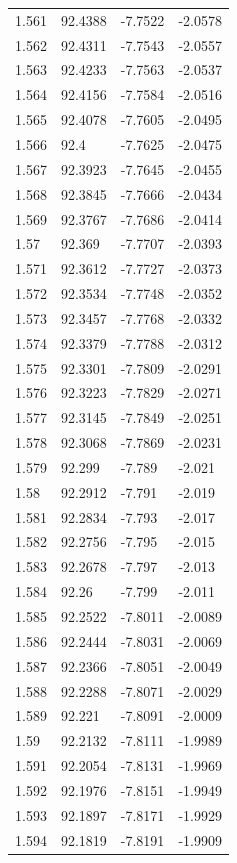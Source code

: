 \begin{tabular}{llll}
1.561 & 92.4388 & -7.7522 & -2.0578 \\
1.562 & 92.4311 & -7.7543 & -2.0557 \\
1.563 & 92.4233 & -7.7563 & -2.0537 \\
1.564 & 92.4156 & -7.7584 & -2.0516 \\
1.565 & 92.4078 & -7.7605 & -2.0495 \\
1.566 & 92.4 & -7.7625 & -2.0475 \\
1.567 & 92.3923 & -7.7645 & -2.0455 \\
1.568 & 92.3845 & -7.7666 & -2.0434 \\
1.569 & 92.3767 & -7.7686 & -2.0414 \\
1.57 & 92.369 & -7.7707 & -2.0393 \\
1.571 & 92.3612 & -7.7727 & -2.0373 \\
1.572 & 92.3534 & -7.7748 & -2.0352 \\
1.573 & 92.3457 & -7.7768 & -2.0332 \\
1.574 & 92.3379 & -7.7788 & -2.0312 \\
1.575 & 92.3301 & -7.7809 & -2.0291 \\
1.576 & 92.3223 & -7.7829 & -2.0271 \\
1.577 & 92.3145 & -7.7849 & -2.0251 \\
1.578 & 92.3068 & -7.7869 & -2.0231 \\
1.579 & 92.299 & -7.789 & -2.021 \\
1.58 & 92.2912 & -7.791 & -2.019 \\
1.581 & 92.2834 & -7.793 & -2.017 \\
1.582 & 92.2756 & -7.795 & -2.015 \\
1.583 & 92.2678 & -7.797 & -2.013 \\
1.584 & 92.26 & -7.799 & -2.011 \\
1.585 & 92.2522 & -7.8011 & -2.0089 \\
1.586 & 92.2444 & -7.8031 & -2.0069 \\
1.587 & 92.2366 & -7.8051 & -2.0049 \\
1.588 & 92.2288 & -7.8071 & -2.0029 \\
1.589 & 92.221 & -7.8091 & -2.0009 \\
1.59 & 92.2132 & -7.8111 & -1.9989 \\
1.591 & 92.2054 & -7.8131 & -1.9969 \\
1.592 & 92.1976 & -7.8151 & -1.9949 \\
1.593 & 92.1897 & -7.8171 & -1.9929 \\
1.594 & 92.1819 & -7.8191 & -1.9909 \\

\end{tabular}
